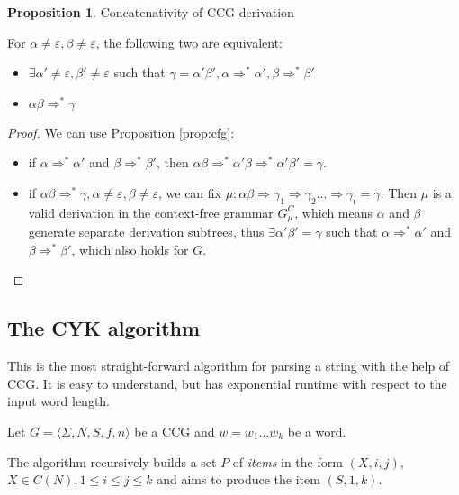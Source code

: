 \documentclass[12pt]{extarticle}
\theoremstyle{definition} \newtheorem{defn}{Definition}
\theoremstyle{definition} \newtheorem{prop}{Proposition}
\begin{document}
\begin{prop}\label{prop:concat}
    Concatenativity of CCG derivation

    For $\alpha \neq \varepsilon, \beta \neq \varepsilon$, the following two are equivalent:
    \begin{itemize}

        \item $\exists \alpha' \neq \varepsilon, \beta' \neq \varepsilon$
            such that $\gamma = \alpha' \beta', \alpha \Rightarrow^* \alpha', \beta \Rightarrow^* \beta'$
        \item $\alpha \beta \Rightarrow^* \gamma$
    \end{itemize}
\end{prop}
\begin{proof}
    We can use Proposition \ref{prop:cfg}:

    \begin{itemize}
        \item if $\alpha \Rightarrow^* \alpha'$ and $\beta \Rightarrow^* \beta'$,
            then $\alpha \beta \Rightarrow^* \alpha' \beta \Rightarrow^* \alpha' \beta' = \gamma$.
        \item if $\alpha \beta \Rightarrow^* \gamma, \alpha \neq \varepsilon, \beta \neq \varepsilon$,
            we can fix $\mu: \alpha \beta \Rightarrow \gamma_1 \Rightarrow \gamma_2 ... \Rightarrow \gamma_t = \gamma$.
            Then $\mu$ is a valid derivation in the context-free grammar $G^C_{\mu}$,
            which means $\alpha$ and $\beta$ generate separate derivation
            subtrees, thus $\exists \alpha' \beta' = \gamma$ such that
            $\alpha \Rightarrow^* \alpha'$ and $\beta \Rightarrow^* \beta'$,
            which also holds for $G$.
    \end{itemize}
\end{proof}

\subsection{The CYK algorithm}

This is the most straight-forward algorithm for parsing a string with the help
of CCG. It is easy to understand, but has exponential runtime with respect to
the input word length.

Let $ G = \langle \Sigma, N, S, f, n \rangle $ be a CCG and $w = w_1 ... w_k$
be a word.

The algorithm recursively builds a set $P$ of \emph{items} in the form
$(X, i, j)$, $X \in C(N), 1 \leq i \leq j \leq k$ and aims to produce the item
$(S, 1, k)$.
\end{document}
